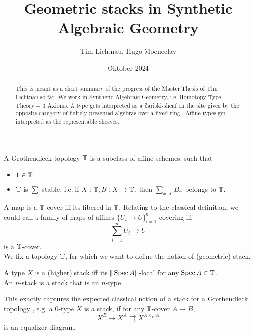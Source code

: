 \documentclass{article}
\title{Geometric stacks in Synthetic Algebraic Geometry }
\author{Tim Lichtnau, Hugo Moeneclay}
\date{Oktober 2024}
\newcommand{\ignore}[1]{}
\begin{document}
	\maketitle
	\begin{abstract}
		\noindent This is meant as a short summary of the progress of the Master Thesis of Tim Lichtnau so far. We work in Synthetic Algebraic Geometry, i.e. Homotopy Type Theory + 3 Axioms. A type gets interpreted as a Zariski-sheaf on the site given by the opposite category of finitely presented algebras over a fixed ring \cite{cherubini2023foundationsyntheticalgebraicgeometry}. Affine types get interpreted as the representable sheaves.
	\end{abstract}
	\begin{definition}
		A Grothendieck topology $\mathbb{T}$ is a subclass of affine schemes, such that 
		\begin{itemize}
			\item $1 \in \mathbb{T}$
			\item $\mathbb{T}$ is $\sum$-stable, i.e. if $X : \mathbb{T}, B : X \to \mathbb{T}$, then $\sum_{x :X} B x$ belongs to $\mathbb{T}$.
		\end{itemize}
	\end{definition}
	A map is a $\mathbb{T}$-cover iff its fibered in $\mathbb{T}$.
	Relating to the classical definition, we could call a family of maps of affines $\{U_i \to U\}_{i=1}^n$ covering iff 
	\[
	\sum_{i=1}^n U_i \to U
	\]
	is a $\mathbb{T}$-cover. \\
	We fix a topology $\mathbb{T}$, for which we want to define the notion of (geometric) stack. \\
	\begin{definition}
		A type $X$ is a (higher) stack iff its $\| \operatorname{Spec} A \|$-local for any $\operatorname{Spec} A \in \mathbb{T}$. \\
		An $n$-stack is a stack that is an $n$-type.
	\end{definition}
	This exactly captures the expected classical notion of a stack for a Grothendieck topology \cite{SAGsheaves}, e.g. a 0-type $X$ is a stack, if for any $\mathbb{T}$-cover $A \to B$, 
	\[X^B \to X^A \rightrightarrows X^{A \times_B A}\]
	is an equalizer diagram.
\end{document}

